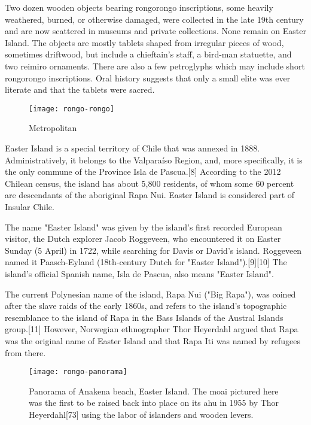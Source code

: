 Two dozen wooden objects bearing rongorongo inscriptions, some heavily weathered, burned, or otherwise damaged, were collected in the late 19th century and are now scattered in museums and private collections. None remain on Easter Island. The objects are mostly tablets shaped from irregular pieces of wood, sometimes driftwood, but include a chieftain's staff, a bird-man statuette, and two reimiro ornaments. There are also a few petroglyphs which may include short rongorongo inscriptions. Oral history suggests that only a small elite was ever literate and that the tablets were sacred.

\begin{figure}[htbp]
\texttt{[image: rongo-rongo]}
\caption{Metropolitan}
\end{figure}



Easter Island is a special territory of Chile that was annexed in 1888. Administratively, it belongs to the Valparaíso Region, and, more specifically, it is the only commune of the Province Isla de Pascua.[8] According to the 2012 Chilean census, the island has about 5,800 residents, of whom some 60 percent are descendants of the aboriginal Rapa Nui.
Easter Island is considered part of Insular Chile.

The name "Easter Island" was given by the island's first recorded European visitor, the Dutch explorer Jacob Roggeveen, who encountered it on Easter Sunday (5 April) in 1722, while searching for Davis or David's island. Roggeveen named it Paasch-Eyland (18th-century Dutch for "Easter Island").[9][10] The island's official Spanish name, Isla de Pascua, also means "Easter Island".

The current Polynesian name of the island, Rapa Nui ("Big Rapa"), was coined after the slave raids of the early 1860s, and refers to the island's topographic resemblance to the island of Rapa in the Bass Islands of the Austral Islands group.[11] However, Norwegian ethnographer Thor Heyerdahl argued that Rapa was the original name of Easter Island and that Rapa Iti was named by refugees from there.

\begin{figure}[htb]
\parindent0pt

\hspace*{-3.8cm}\texttt{[image: rongo-panorama]}

\caption{Panorama of Anakena beach, Easter Island. The moai pictured here was the first to be raised back into place on its ahu in 1955 by Thor Heyerdahl[73] using the labor of islanders and wooden levers.}
\end{figure}



